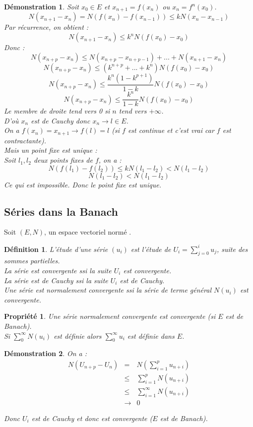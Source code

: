 \documentclass[a4paper, oneside]{report}
\theoremstyle{break}
\newtheorem{defi}[thm]{Définition}
\newtheorem{propr}[thm]{Propriété}
\newtheorem*{demo}{Démonstration}
\newcommand{\evn}{espace vectoriel normé }
\begin{document}
\begin{demo}
Soit $x_0\in E$ et $x_{n+1}=f(x_n)$ ou $x_n=f^n(x_0)$.\\
$$N(x_{n+1}-x_n)=N(f(x_n)-f(x_{n-1}))\leq kN(x_n-x_{n-1})$$
Par récurrence, on obtient :
$$N(x_{n+1}-x_n) \leq k^nN(f(x_0)-x_0)$$
Donc :
$$N(x_{n+p}-x_n)\leq N(x_{n+p}-x_{n+p-1})+...+N(x_{n+1}-x_n)$$
$$N(x_{n+p}-x_n)\leq (k^{n+p}+...+k^n)N(f(x_0)-x_0)$$
$$N(x_{n+p}-x_n)\leq \frac{k^n(1-k^{p+1})}{1-k} N(f(x_0)-x_0)$$
$$N(x_{n+p}-x_n)\leq \frac{k^n}{1-k}N(f(x_0)-x_0)$$
Le membre de droite tend vers 0 si $n$ tend vers $+\infty$.\\
D'où $x_n$ est de Cauchy donc $x_n\rightarrow l \in E$.\\
On a $f(x_n)=x_{n+1}\rightarrow f(l)=l$ (si $f$ est continue et c'est vrai car $f$ est contractante).\\
Mais un point fixe est unique :\\
Soit $l_1,l_2$ deux points fixes de $f$, on a :
$$N(f(l_1)-f(l_2)) \leq kN(l_1-l_2) < N(l_1-l_2)$$
$$N(l_1-l_2) < N(l_1-l_2)$$
Ce qui est impossible. Donc le point fixe est unique.
\end{demo}



\subsection{Séries dans la Banach}

Soit $(E,N)$, un \evn.\\

\begin{defi}                    
L'étude d'une série $(u_i)$ est l'étude de $U_i=\sum_{j=0}^{i}u_j$, suite des sommes partielles.\\
La série est convergente ssi la suite $U_i$ est convergente.\\
La série est de Cauchy ssi la suite $U_i$ est de Cauchy.\\
Une série est normalement convergente ssi la série de terme général $N(u_i)$ est convergente.
\end{defi}

\begin{propr}
Une série normalement convergente est convergente (si $E$ est de Banach).\\
Si $\sum_{0}^\infty N(u_i)$ est définie alors $\sum_{0}^\infty u_i$ est définie dans $E$.
\end{propr}


\begin{demo}
On a :
$$\begin{array}{lll}
N(U_{n+p}-U_n)&=&N(\sum_{i=1}^p u_{n+i})\\
&\leq & \sum_{i=1}^p N(u_{n+i})\\
&\leq & \sum_{i=1}^\infty N(u_{n+i})\\
&\rightarrow & 0
\end{array}$$

Donc $U_i$ est de Cauchy et donc est convergente ($E$ est de Banach).

\end{demo}
\end{document}
